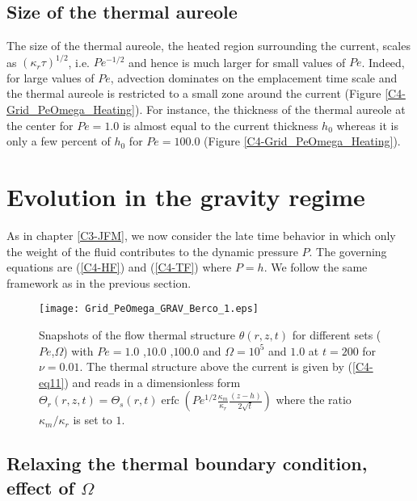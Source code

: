 \subsection{Size of the thermal aureole}
\label{C4-sec:char-therm-anom}

The size  of the  thermal aureole, the  heated region  surrounding the
current,  scales as  $(\kappa_r  \tau)^{1/2}$,  i.e.  $Pe^{-1/2}$  and
hence is  much larger  for small  values of  $Pe$.  Indeed,  for large
values of $Pe$, advection dominates  on the emplacement time scale and
the thermal aureole  is restricted to a small zone  around the current
(Figure \ref{C4-Grid_PeOmega_Heating}). For instance, the thickness of
the thermal aureole at the center  for $Pe=1.0$ is almost equal to the
current thickness $h_0$ whereas it is  only a few percent of $h_0$ for
$Pe=100.0$ (Figure \ref{C4-Grid_PeOmega_Heating}).

\section{Evolution in the gravity regime}
\label{C4-sec:evol-grav-regime}

As in chapter \ref{C3-JFM}, we now  consider the late time behavior in
which only the weight of the fluid contributes to the dynamic pressure
$P$. The governing equations are (\ref{C4-HF}) and (\ref{C4-TF}) where
$P=h$. We follow the same framework as in the previous section.

\begin{figure}[h!]
  \begin{center}
    \graphicspath{ {/Users/thorey/Documents/These/Projet/Refroidissement/Skin_Model/Figure/Figure_Heating/} }
    \texttt{[image: Grid\_PeOmega\_GRAV\_Berco\_1.eps]}
    \caption{Snapshots of  the flow thermal  structure $\theta(r,z,t)$
      for  different  sets  ($Pe$,$\Omega$)  with  $Pe=  1.0$  ,$10.0$
      ,$100.0$   and   $\Omega=10^5$   and  $1.0$   at   $t=200$   for
      $\nu=0.01$. The thermal structure above  the current is given by
      (\ref{C4-eq11})    and   reads    in   a    dimensionless   form
      $\Theta_r(r,z,t)=\Theta_s(r,t)\operatorname{erfc}{\left(Pe^{1/2}\frac{\kappa_m}{\kappa_r}\frac{(z-h)}{2\sqrt{t}}\right)}$
      where the ratio $\kappa_m/\kappa_r$ is set to $1$.}
    \label{C4-Grid_PeOmega_Heating_GRAV}
  \end{center}
\end{figure}

\subsection{Relaxing  the   thermal  boundary  condition,   effect  of
  $\Omega$}
\label{C4-sec:infl-therm-bound}

